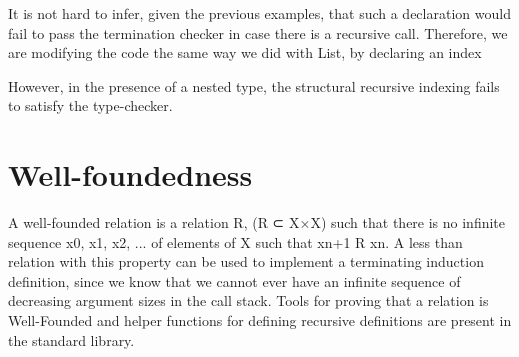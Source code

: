 \documentclass[12pt,twoside,notitlepage]{report}
\newcommand{\Conid}[1]{\mathit{#1}}
\newcommand{\Varid}[1]{\mathit{#1}}
\def\resethooks{%
  \global\let\SaveRestoreHook\empty
  \global\let\ColumnHook\empty}
\newlength{\blanklineskip}
\newcommand{\hsindent}[1]{\quad}%
\let\hspre\empty
\let\hspost\empty
\begin{document}
It is not hard to infer, given the previous examples, that such a declaration would fail to pass the termination checker in case there is a recursive call. Therefore, we are modifying the code the same way we did with List, by declaring an index

\resethooks


However, in the presence of a nested type, the structural recursive indexing fails to satisfy the type-checker.

\section{Well-foundedness}

A well-founded relation is a relation R, (R ⊂ X×X) such that there is no infinite sequence x0, x1, x2, ... of elements of X such that xn+1 R xn. A less than
relation with this property can be used to implement a terminating induction definition, since we know that we cannot ever have an infinite sequence of
decreasing argument sizes in the call stack.
Tools for proving that a relation is Well-Founded and helper functions for defining recursive definitions are present in the standard library.
\end{document}
